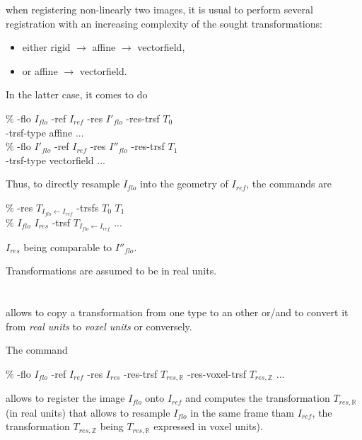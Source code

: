  when registering non-linearly two images, it is usual to perform several registration with an increasing complexity of the sought transformations:
\begin{itemize}
\itemsep -1ex
\item either rigid $\rightarrow$ affine $\rightarrow$ vectorfield,
\item or affine $\rightarrow$ vectorfield.
\end{itemize}
In the latter case, it comes to do 
\begin{code}{0.8}
\% \blockmatching -flo $I_{flo}$ -ref $I_{ref}$ -res $I'_{flo}$ -res-trsf $T_{0}$ \\
\hphantom{\% } -trsf-type affine ... \\
\% \blockmatching -flo $I'_{flo}$ -ref $I_{ref}$ -res $I''_{flo}$ -res-trsf $T_{1}$ \\
\hphantom{\% } -trsf-type vectorfield ... \\
\end{code}
Thus, to directly resample $I_{flo}$ into the geometry of $I_{ref}$, the commands are
\begin{code}{0.8}
\% \composeTrsf -res $T_{I_{flo} \leftarrow I_{ref}}$ -trsfs $T_0$ $T_1$ \\
\% \applyTrsf $I_{flo}$ $I_{res}$ -trsf $T_{I_{flo} \leftarrow I_{ref}}$ ... 
\end{code}
$I_{res}$ being comparable to $I''_{flo}$.

\begin{attention}
Transformations are assumed to be in real units.
\end{attention}

\section{\copyTrsf}


\copyTrsf allows to copy a transformation from one type to an other or/and to convert it from \textit{real units} to \textit{voxel units} or conversely.

The command
\begin{code}{0.8}
\% \blockmatching -flo $I_{flo}$ -ref $I_{ref}$ -res $I_{res}$ -res-trsf $T_{res,\mathbb{R}}$ -res-voxel-trsf $T_{res,\mathbb{Z}}$ ...
\end{code}
allows to register the image $I_{flo}$ onto $I_{ref}$ and computes the transformation 
$T_{res,\mathbb{R}}$ (in real units) that allows to resample $I_{flo}$ in the same frame tham $I_{ref}$, the transformation $T_{res,\mathbb{Z}}$ being $T_{res,\mathbb{R}}$ expressed in voxel units).

